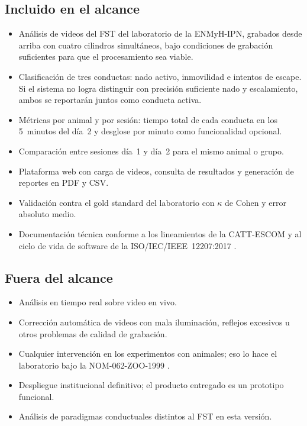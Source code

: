 \subsection*{Incluido en el alcance}
\begin{itemize}
  \item Análisis de videos del FST del laboratorio de la ENMyH-IPN, grabados desde
        arriba con cuatro cilindros simultáneos, bajo condiciones de grabación
        suficientes para que el procesamiento sea viable.
  \item Clasificación de tres conductas: nado activo, inmovilidad e intentos de escape.
        Si el sistema no logra distinguir con precisión suficiente nado y escalamiento,
        ambos se reportarán juntos como conducta activa.
  \item Métricas por animal y por sesión: tiempo total de cada conducta en los
        5~minutos del día~2 y desglose por minuto como funcionalidad opcional.
  \item Comparación entre sesiones día~1 y día~2 para el mismo animal o grupo.
  \item Plataforma web con carga de videos, consulta de resultados y generación de
        reportes en PDF y CSV.
  \item Validación contra el gold standard del laboratorio con $\kappa$ de Cohen y
        error absoluto medio.
  \item Documentación técnica conforme a los lineamientos de la CATT-ESCOM y al ciclo
        de vida de software de la ISO/IEC/IEEE~12207:2017 \cite{iso12207}.
\end{itemize}

\subsection*{Fuera del alcance}
\begin{itemize}
  \item Análisis en tiempo real sobre video en vivo.
  \item Corrección automática de videos con mala iluminación, reflejos excesivos u
        otros problemas de calidad de grabación.
  \item Cualquier intervención en los experimentos con animales; eso lo hace el
        laboratorio bajo la NOM-062-ZOO-1999 \cite{nom062}.
  \item Despliegue institucional definitivo; el producto entregado es un prototipo
        funcional.
  \item Análisis de paradigmas conductuales distintos al FST en esta versión.
\end{itemize}

